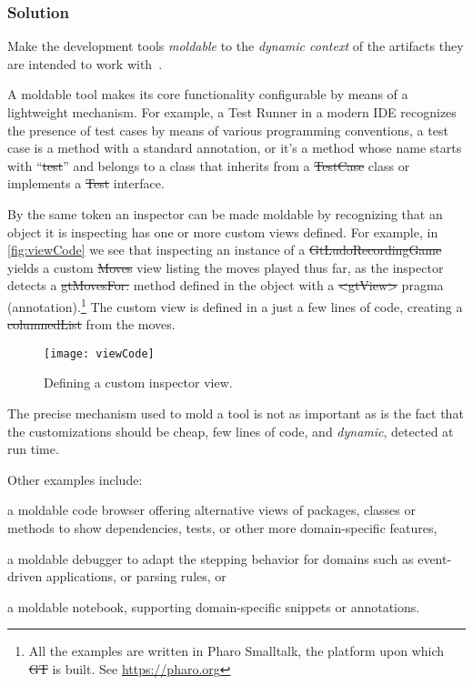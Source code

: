 \documentclass[sigconf]{acmart}
\newcommand{\GT}{\st{GT}\xspace} %
\begin{document}
\subsubsection*{Solution}
Make the development tools \emph{moldable} to the \emph{dynamic context} of the artifacts they are intended to work with~\cite{Chis17a}.

A moldable tool makes its core functionality configurable by means of a lightweight mechanism.
For example, a Test Runner in a modern IDE recognizes the presence of test cases by means of various programming conventions, \ie a test case is a method with a standard annotation, or it's a method whose name starts with ``\st{test}'' and belongs to a class that inherits from a \st{TestCase} class or implements a \st{Test} interface.

By the same token an inspector can be made moldable by recognizing that an object it is inspecting has one or more custom views defined.
For example, in \autoref{fig:viewCode} we see that inspecting an instance of a \st{GtLudoRecordingGame} yields a custom \st{Moves} view listing the moves played thus far, as the inspector detects a \st{gtMovesFor:} method defined in the object with a \st{<gtView>} pragma (\ie annotation).\footnote{All the examples are written in Pharo Smalltalk, the platform upon which \GT is built. See \url{https://pharo.org}}
The custom view is defined in a just a few lines of code, creating a \st{columnedList} from the moves.

\begin{figure}[h]
  \texttt{[image: viewCode]}
  \caption{Defining a custom inspector view.}
  \label{fig:viewCode}
\end{figure}

The precise mechanism used to mold a tool is not as important as is the fact that the customizations should be cheap, \ie few lines of code, and \emph{dynamic}, \ie detected at run time.

Other examples include:
\begin{inparaenum}[(i)]
\item a moldable code browser offering alternative views of packages, classes or methods to show dependencies, tests, or other more domain-specific features,
\item a moldable debugger to adapt the stepping behavior for domains such as event-driven applications, or parsing rules, or
\item a moldable notebook, supporting domain-specific snippets or annotations.
\end{inparaenum}
\end{document}
